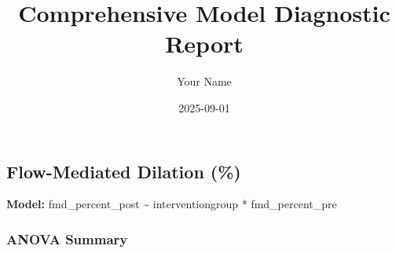 \documentclass[
]{article}
\title{Comprehensive Model Diagnostic Report}
\author{Your Name}
\date{2025-09-01}
\begin{document}
\maketitle

\subsection{Flow-Mediated Dilation (\%)}\label{flow-mediated-dilation}

\textbf{Model:} fmd\_percent\_post \textasciitilde{} interventiongroup *
fmd\_percent\_pre

\subsubsection{ANOVA Summary}\label{anova-summary}
\end{document}
